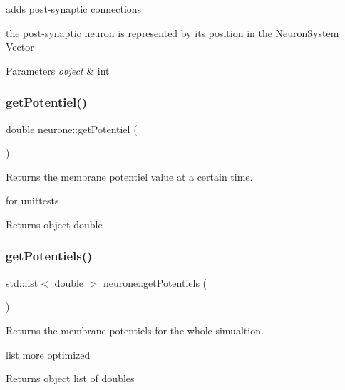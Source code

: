add\textquotesingle{}s post-\/synaptic connections 

the post-\/synaptic neuron is represented by its position in the Neuron\+System Vector


\begin{DoxyParams}{Parameters}
{\em object} & int \\
\hline
\end{DoxyParams}
\mbox{\label{classneurone_a938d3de8c8ae1c340e72e4a95c54299b}} 
\subsubsection{\texorpdfstring{get\+Potentiel()}{getPotentiel()}}
{\footnotesize\ttfamily double neurone\+::get\+Potentiel (\begin{DoxyParamCaption}{ }\end{DoxyParamCaption})}



Returns the membrane potentiel value at a certain time. 

for unittests

\begin{DoxyReturn}{Returns}
object double 
\end{DoxyReturn}
\mbox{\label{classneurone_a2dc85a6664fb7c1ada0283c23460fe1f}} 
\subsubsection{\texorpdfstring{get\+Potentiels()}{getPotentiels()}}
{\footnotesize\ttfamily std\+::list$<$ double $>$ neurone\+::get\+Potentiels (\begin{DoxyParamCaption}{ }\end{DoxyParamCaption})}



Returns the membrane potentiels for the whole simualtion. 

list more optimized \begin{DoxyReturn}{Returns}
object list of doubles 
\end{DoxyReturn}
\mbox{\label{classneurone_a9570ddccdc114d63de75d2c454fbcb52}} 
